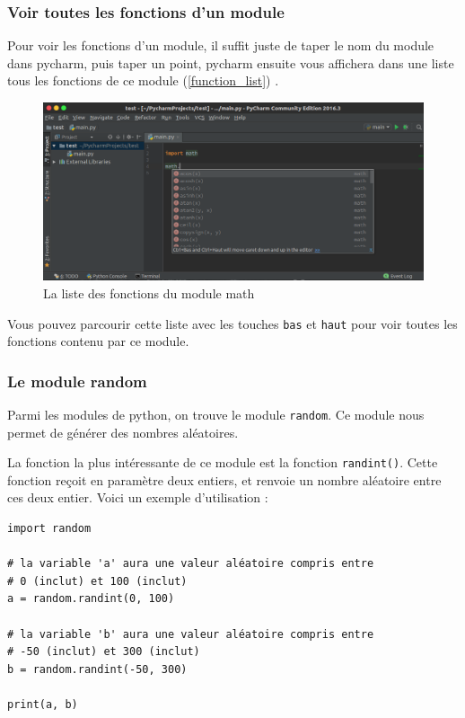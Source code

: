 \documentclass[12pt]{article}
\newcommand{\code}[1]{\colorbox{light-gray}{\texttt{#1}}}
\begin{document}
        \subsubsection{Voir toutes les fonctions d'un module}
            Pour voir les fonctions d'un module, il suffit juste de taper le nom du module dans pycharm, puis taper un 
            point, pycharm ensuite vous affichera dans une liste tous les fonctions de ce module 
            (\autoref{function_list}) .

            \begin{figure}[H]
                \centering
                \includegraphics[width=\linewidth]{img/18_modules.png}
                \caption{La liste des fonctions du module math}
                \label{function_list}
            \end{figure}

            Vous pouvez parcourir cette liste avec les touches \code{bas} et \code{haut} pour voir toutes les fonctions
            contenu par ce module.

        \subsubsection{Le module random}
            Parmi les modules de python, on trouve le module \code{random}. Ce module nous permet de générer des
            nombres aléatoires. 

            La fonction la plus intéressante de ce module est la fonction \code{randint()}. Cette fonction reçoit en
            paramètre deux entiers, et renvoie un nombre aléatoire entre ces deux entier. Voici un exemple 
            d'utilisation :
            \begin{lstlisting}[style=code, breaklines=false]
import random

# la variable 'a' aura une valeur aléatoire compris entre
# 0 (inclut) et 100 (inclut)
a = random.randint(0, 100)

# la variable 'b' aura une valeur aléatoire compris entre
# -50 (inclut) et 300 (inclut)
b = random.randint(-50, 300)

print(a, b)
            \end{lstlisting}
\end{document}

